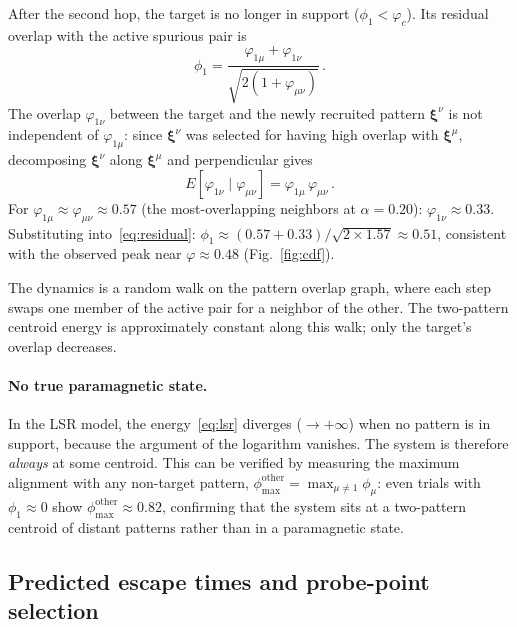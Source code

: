 \documentclass[11pt]{article}
\newcommand{\bxi}{\boldsymbol{\xi}}
\begin{document}
After the second hop, the target is no longer in support ($\phi_1 < \varphi_c$).  Its residual overlap with the active spurious pair is
\begin{equation}
\phi_1 = \frac{\varphi_{1\mu} + \varphi_{1\nu}}{\sqrt{2(1+\varphi_{\mu\nu})}}\,.
\label{eq:residual}
\end{equation}
The overlap $\varphi_{1\nu}$ between the target and the newly recruited pattern $\bxi^\nu$ is not independent of $\varphi_{1\mu}$: since $\bxi^\nu$ was selected for having high overlap with $\bxi^\mu$, decomposing $\bxi^\nu$ along $\bxi^\mu$ and perpendicular gives
\begin{equation}
E[\varphi_{1\nu} \mid \varphi_{\mu\nu}] = \varphi_{1\mu}\,\varphi_{\mu\nu}\,.
\label{eq:conditional}
\end{equation}
For $\varphi_{1\mu} \approx \varphi_{\mu\nu} \approx 0.57$ (the most-overlapping neighbors at $\alpha = 0.20$): $\varphi_{1\nu} \approx 0.33$.  Substituting into~\eqref{eq:residual}: $\phi_1 \approx (0.57 + 0.33)/\sqrt{2 \times 1.57} \approx 0.51$, consistent with the observed peak near $\varphi \approx 0.48$ (Fig.~\ref{fig:cdf}).

The dynamics is a random walk on the pattern overlap graph, where each step swaps one member of the active pair for a neighbor of the other.  The two-pattern centroid energy is approximately constant along this walk; only the target's overlap decreases.

\paragraph{No true paramagnetic state.}
In the LSR model, the energy~\eqref{eq:lsr} diverges ($\to +\infty$) when no pattern is in support, because the argument of the logarithm vanishes.  The system is therefore \emph{always} at some centroid.  This can be verified by measuring the maximum alignment with any non-target pattern, $\phi_{\max}^{\mathrm{other}} = \max_{\mu \neq 1} \phi_\mu$: even trials with $\phi_1 \approx 0$ show $\phi_{\max}^{\mathrm{other}} \approx 0.82$, confirming that the system sits at a two-pattern centroid of distant patterns rather than in a paramagnetic state.

\subsection{Predicted escape times and probe-point selection}
\label{ssec:escape_predictions}
\end{document}
